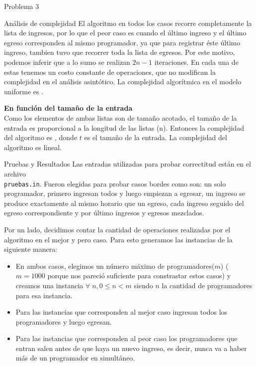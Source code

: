 \begin{section}{Problema 3}
\begin{subsection}{Análisis de complejidad}
El algoritmo en todos los casos recorre completamente la lista de ingresos, por lo que el peor caso es cuando el último ingreso y el último egreso corresponden al mismo programador, ya que para registrar éste último ingreso, tambien tuvo que recorrer toda la lista de egresos. Por este motivo, podemos inferir que a lo sumo se realizan $2n -1$ iteraciones. En cada una de estas tenemos un costo constante de operaciones, que no modifican la complejidad en el análisis asintótico. La complejidad algorítmica en el modelo uniforme es .\VSP

		\noindent\textbf{En función del tamaño de la entrada}\\

			Como los elementos de ambas listas son de tamaño acotado, el tamaño de la entrada es proporcional a la longitud de las listas (n). Entonces la complejidad del algoritmo es , donde $t$ es el tamaño de la entrada. La complejidad del algoritmo es lineal.
	\end{subsection}

	\begin{subsection}{Pruebas y Resultados}
	Las entradas utilizadas para probar correctitud están en el archivo\\ \texttt{pruebas.in}. Fueron elegidas para probar casos bordes como son: un solo programador, primero ingresan todos y luego empiezan a egresar, un ingreso se produce exactamente al mismo horario que un egreso, cada ingreso seguido del egreso correspondiente y por último ingresos y egresos mezclados.

	Por un lado, decidimos contar la cantidad de operaciones realizadas por el algoritmo en el mejor y pero caso. Para esto generamos las instancias de la siguiente manera:
	\begin{itemize}
		\item En ambos casos, elegimos un número máximo de programadores($m$) ($m=1000$ porque nos pareció suficiente para constrastar estos casos) y creamos una instancia $\forall\;n,0\leq n < m$ siendo $n$ la cantidad de programadores para esa instancia.
		\item Para las instancias que corresponden al mejor caso ingresan todos los programadores y luego egresan.
		\item Para las instancias que corresponden al peor caso los programadores que entran salen antes de que haya un nuevo ingreso, es decir, nunca va a haber más de un programador en simultáneo.
	\end{itemize}


\end{subsection}
\end{section}
